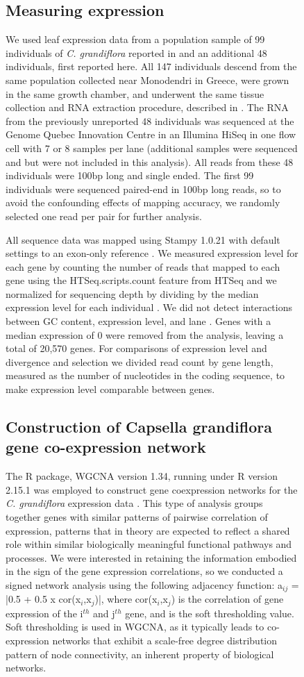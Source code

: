 \begin{figure}[ht!]
\subsection{Measuring expression}
We used leaf expression data from a population sample of 99 individuals of \textit{C. grandiflora} reported in \citet{Josephs2015-nx} and an additional 48 individuals, first reported here. All 147 individuals descend from the same population collected near Monodendri in Greece, were grown in the same growth chamber, and underwent the same tissue collection and RNA extraction procedure, described in \citet{Josephs2015-nx}. The RNA from the previously unreported 48 individuals was sequenced at the Genome Quebec Innovation Centre in an Illumina HiSeq in one flow cell with 7 or 8 samples per lane (additional samples were sequenced and but were not included in this analysis). All reads from these 48 individuals were 100bp long and single ended. The first 99 individuals were sequenced paired-end in 100bp long reads, so to avoid the confounding effects of mapping accuracy, we randomly selected one read per pair for further analysis.

All sequence data was mapped using Stampy 1.0.21 \citep{Lunter2011-uc} with default settings to an exon-only reference \citep{Josephs2015-nx}. We measured expression level for each gene by counting the number of reads that mapped to each gene using the HTSeq.scripts.count feature from HTSeq and we normalized for sequencing depth by dividing by the median expression level for each individual \citep{Anders2015-qa}. We did not detect interactions between GC content, expression level, and lane \citep{Josephs2015-nx}. Genes with a median expression of 0 were removed from the analysis, leaving a total of 20,570 genes. For comparisons of expression level and divergence and selection we divided read count by gene length, measured as the number of nucleotides in the coding sequence, to make expression level comparable between genes.

\subsection{Construction of Capsella grandiflora gene co-expression network}
The R package, WGCNA version 1.34, running under R version 2.15.1 \citep{r} was employed to construct gene coexpression networks for the \textit{C. grandiflora} expression data \citep{langfelder2008}. This type of analysis groups together genes with similar patterns of pairwise correlation of expression, patterns that in theory are expected to reflect a shared role within similar biologically meaningful functional pathways and processes. We were interested in retaining the information embodied in the sign of the gene expression correlations, so we conducted a signed network analysis using the following adjacency function: a$_{ij}$ = |0.5 + 0.5 x cor(x$_{i}$,x$_{j}$)|, where cor(x$_{i}$,x$_{j}$) is the correlation of gene expression of the i$^{th}$ and j$^{th}$ gene, and is the soft thresholding value. Soft thresholding is used in WGCNA, as it typically leads to co-expression networks that exhibit a scale-free degree distribution pattern of node connectivity, an inherent property of biological networks. 


\end{figure}
